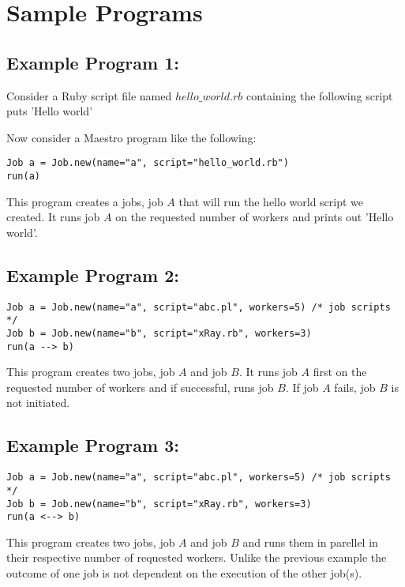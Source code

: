 \section{Sample Programs}
\label{sect:samples}
\subsection*{Example Program 1:}
Consider a Ruby script file named $hello\_world.rb$ containing the following script
puts 'Hello world'

Now consider a Maestro program like the following:
\begin{verbatim}
Job a = Job.new(name="a", script="hello_world.rb")
run(a)
\end{verbatim}

This program creates a jobs, job $A$ that will run the hello world script we created. 
It runs job $A$ on the requested number of workers and prints out 'Hello world'.
\\

\subsection*{Example Program 2:}
\begin{verbatim}
Job a = Job.new(name="a", script="abc.pl", workers=5) /* job scripts */
Job b = Job.new(name="b", script="xRay.rb", workers=3)
run(a --> b)
\end{verbatim}

This program creates two jobs, job $A$ and job $B$. It runs job $A$ first on the requested number of workers
and if successful, runs job $B$. If job $A$ fails, job $B$ is not initiated.
\\

\subsection*{Example Program 3:}
\begin{verbatim}
Job a = Job.new(name="a", script="abc.pl", workers=5) /* job scripts */
Job b = Job.new(name="b", script="xRay.rb", workers=3)
run(a <--> b)
\end{verbatim}

This program creates two jobs, job $A$ and job $B$ and runs them in parellel in their respective number of requested workers.
Unlike the previous example the outcome of one job is not dependent on the execution of the other job(s).
\\

